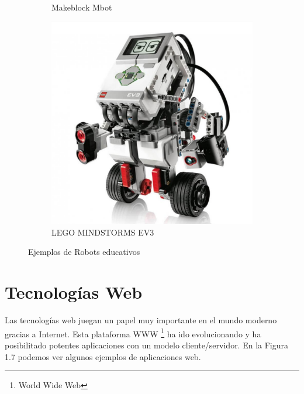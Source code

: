 \begin{figure}[H]
\begin{subfigure}{.3\linewidth}
        \caption{Makeblock Mbot}
    \end{subfigure}
    \begin{subfigure}{.3\linewidth}
       \includegraphics[width=1\textwidth]{chapters/images/lego.png}
        \caption{LEGO MINDSTORMS EV3}
    \end{subfigure}
    \caption{Ejemplos de Robots educativos}
\end{figure}


\newpage
\section{Tecnologías Web}
Las tecnologías web juegan un papel muy importante en el mundo moderno gracias a Internet. Esta plataforma WWW \footnote{World Wide Web}\cite{www}
ha ido evolucionando y ha posibilitado potentes aplicaciones con un modelo cliente/servidor. En la Figura 1.7 podemos ver algunos ejemplos de aplicaciones web.

